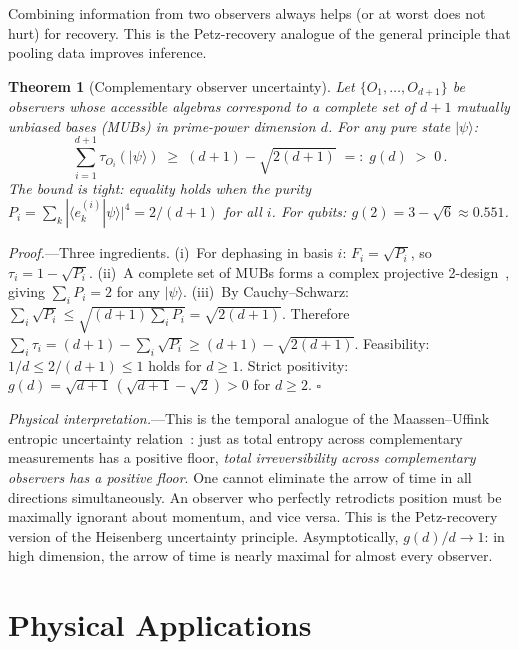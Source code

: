 \documentclass[prl,twocolumn,superscriptaddress,longbibliography,floatfix]{revtex4-2}
\newtheorem{theorem}{Theorem}
\newcommand{\ket}[1]{|#1\rangle}
\newcommand{\braket}[2]{\langle#1|#2\rangle}
\newcommand{\tauasym}{\tau}
\begin{document}
Combining information from two observers always helps (or at
worst does not hurt) for recovery.  This is the Petz-recovery
analogue of the general principle that pooling data improves
inference.

\begin{theorem}[Complementary observer uncertainty]
\label{thm:comp}
Let $\{O_1, \ldots, O_{d+1}\}$ be observers whose accessible
algebras correspond to a complete set of $d+1$ mutually unbiased
bases (MUBs) in prime-power dimension $d$.
For any pure state $\ket{\psi}$:
\begin{equation}
\sum_{i=1}^{d+1} \tauasym_{O_i}(\ket{\psi})
\;\geq\; (d+1) - \sqrt{2(d+1)} \;=:\; g(d) \;>\; 0\,.
\label{eq:comp}
\end{equation}
The bound is \emph{tight}: equality holds when the purity
$P_i = \sum_k |\braket{e^{(i)}_k}{\psi}|^4 = 2/(d+1)$
for all $i$.
For qubits: $g(2) = 3 - \sqrt{6} \approx 0.551$.
\end{theorem}

\emph{Proof.}---Three ingredients.
(i)~For dephasing in basis $i$:
$F_i = \sqrt{P_i}$, so $\tauasym_i = 1 - \sqrt{P_i}$.
(ii)~A complete set of MUBs forms a complex projective
2-design~\cite{KlappeneckerRotteler2005}, giving
$\sum_i P_i = 2$ for any $\ket{\psi}$.
(iii)~By Cauchy--Schwarz:
$\sum_i \sqrt{P_i} \leq \sqrt{(d+1)\sum_i P_i}
= \sqrt{2(d+1)}$.
Therefore $\sum_i \tauasym_i = (d+1) - \sum_i\sqrt{P_i}
\geq (d+1) - \sqrt{2(d+1)}$.
Feasibility: $1/d \leq 2/(d+1) \leq 1$ holds for
$d \geq 1$.  Strict positivity: $g(d)
= \sqrt{d+1}\,(\sqrt{d+1} - \sqrt{2}) > 0$ for $d \geq 2$.
\hfill$\square$

\emph{Physical interpretation.}---This is the temporal
analogue of the Maassen--Uffink entropic uncertainty
relation~\cite{MaassenUffink1988}: just as total entropy
across complementary measurements has a positive floor,
\emph{total irreversibility across complementary observers
has a positive floor}.
One cannot eliminate the arrow of time in all
directions simultaneously.  An observer who perfectly retrodicts
position must be maximally ignorant about momentum, and vice
versa.  This is the Petz-recovery version of the Heisenberg
uncertainty principle.
Asymptotically, $g(d)/d \to 1$: in high dimension,
the arrow of time is nearly maximal for almost every observer.

\section{Physical Applications}
\label{sec:applications}
\end{document}
